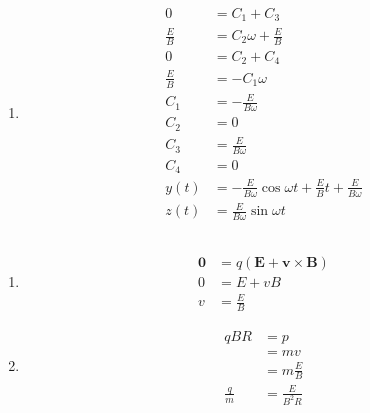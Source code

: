 \documentclass{article}
\renewcommand{\vec}[1]{\boldsymbol{\mathbf{#1}}}
\begin{document}
\begin{enumerate}
  \item

        \begin{align*}
          0           & = C_1 + C_3                                                              \\
          \frac{E}{B} & = C_2 \omega + \frac{E}{B}                                               \\
          0           & = C_2 + C_4                                                              \\
          \frac{E}{B} & = -C_1 \omega                                                            \\
          C_1         & = -\frac{E}{B \omega}                                                    \\
          C_2         & = 0                                                                      \\
          C_3         & = \frac{E}{B \omega}                                                     \\
          C_4         & = 0                                                                      \\
          y(t)        & = -\frac{E}{B \omega} \cos \omega t + \frac{E}{B} t + \frac{E}{B \omega} \\
          z(t)        & = \frac{E}{B \omega} \sin \omega t
        \end{align*}
\end{enumerate}

\subsection{}

\begin{enumerate}
  \item

        \begin{align*}
          \vec{0} & = q (\vec{E} + \vec{v} \times \vec{B}) \\
          0       & = E + v B                              \\
          v       & = \frac{E}{B}
        \end{align*}

  \item

        \begin{align*}
          q B R       & = p               \\
                      & = m v             \\
                      & = m \frac{E}{B}   \\
          \frac{q}{m} & = \frac{E}{B^2 R}
        \end{align*}
\end{enumerate}
\end{document}
